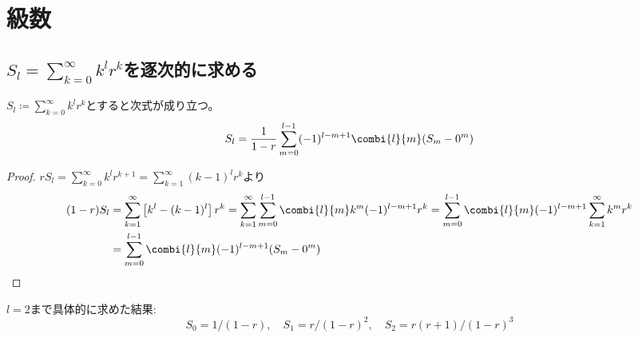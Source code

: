 \chapter{級数}
    \section{\texorpdfstring{$S_l = \sum_{k=0}^\infty k^l r^k$}{A\_l = Σ\_\{k=0\}\string^∞ k\string^l r\string^k}を逐次的に求める}
        \begin{shadebox}
            $S_l \coloneq \sum_{k=0}^\infty k^l r^k$とすると次式が成り立つ。
            \[ S_l = \frac{1}{1-r}\sum_{m=0}^{l-1}(-1)^{l-m+1}\combi{l}{m}(S_m-0^m)\]
        \end{shadebox}
        \begin{proof}
            \quad\par
            $rS_l = \sum_{k=0}^\infty k^l r^{k+1} = \sum_{k=1}^\infty (k-1)^l r^k$より
            \begin{align*}
                (1-r)S_l &= \sum_{k=1}^\infty \left[ k^l-(k-1)^l \right]r^k = \sum_{k=1}^{\infty}\sum_{m=0}^{l-1}\combi{l}{m}k^m(-1)^{l-m+1}r^k = \sum_{m=0}^{l-1}\combi{l}{m}(-1)^{l-m+1}\sum_{k=1}^{\infty}k^m r^k \\
                &= \sum_{m=0}^{l-1}\combi{l}{m}(-1)^{l-m+1}(S_m - 0^m)
            \end{align*}
        \end{proof}
        $l=2$まで具体的に求めた結果:
        \[ S_0 = 1/(1-r),\quad S_1 = r/(1-r)^2,\quad S_2 = r(r+1)/(1-r)^3 \]
